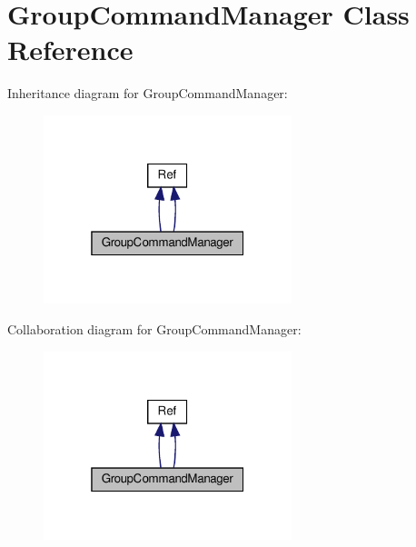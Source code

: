 \hypertarget{classGroupCommandManager}{}\section{Group\+Command\+Manager Class Reference}
\label{classGroupCommandManager}


Inheritance diagram for Group\+Command\+Manager\+:
\nopagebreak
\begin{figure}[H]
\begin{center}
\leavevmode
\includegraphics[width=205pt]{classGroupCommandManager__inherit__graph}
\end{center}
\end{figure}


Collaboration diagram for Group\+Command\+Manager\+:
\nopagebreak
\begin{figure}[H]
\begin{center}
\leavevmode
\includegraphics[width=205pt]{classGroupCommandManager__coll__graph}
\end{center}
\end{figure}
